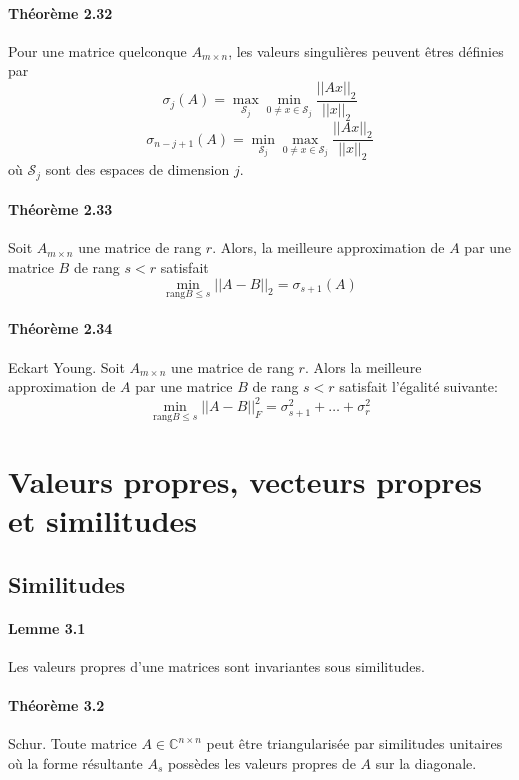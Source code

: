\paragraph{Théorème 2.32} Pour une matrice quelconque $A_{m\times n}$, les valeurs singulières peuvent êtres définies par
$$\sigma_j(A) = \max_{\mathcal{S}_j} \min_{0\neq x \in \mathcal{S}_j} \frac{||Ax||_2}{||x||_2}$$
$$\sigma_{n-j+1}(A) = \min_{\mathcal{S}_j} \max_{0\neq x \in \mathcal{S}_j} \frac{||Ax||_2}{||x||_2}$$où $\mathcal{S}_j$ sont des espaces de dimension $j$.

\paragraph{Théorème 2.33}Soit $A_{m\times n}$ une matrice de rang $r$. Alors, la meilleure approximation de $A$ par une matrice $B$ de rang $s<r$ satisfait
$$ \min_{\text{rang} B \leq s} ||A - B||_2 = \sigma_{s+1} (A)$$

\paragraph{Théorème 2.34} Eckart Young. Soit $A_{m\times n}$ une matrice de rang $r$. Alors la meilleure approximation de $A$ par une matrice $B$ de rang $s<r$ satisfait l'égalité suivante:
$$ \min_{\text{rang} B \leq s} ||A-B||_F^2 = \sigma_{s+1}^2 + \dots + \sigma_r^2$$

\section{Valeurs propres, vecteurs propres et similitudes}

\subsection{Similitudes}

\paragraph{Lemme 3.1} Les valeurs propres d'une matrices sont invariantes sous similitudes.

\paragraph{Théorème 3.2} Schur. Toute matrice $A \in \mathbb{C}^{n\times n}$ peut être triangularisée par similitudes unitaires où la forme résultante $A_s$ possèdes les valeurs propres de $A$ sur la diagonale.

